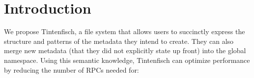 \section{Introduction}
\label{sec:introduction}

 
We propose Tintenfisch, a file system that allows users to succinctly express
the structure and patterns of the metadata they intend to create.  They can
also merge new metadata (that they did not explicitly state up front) into the
global namespace.  Using this semantic knowledge, Tintenfisch can optimize
performance by reducing the number of RPCs needed for:

